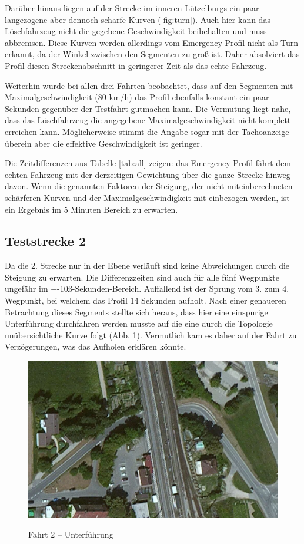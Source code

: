 Darüber hinaus liegen auf der Strecke im inneren Lützelburgs ein paar langezogene aber dennoch scharfe Kurven (\ref{fig:turn}). Auch hier kann das Löschfahrzeug nicht die gegebene Geschwindigkeit beibehalten und muss abbremsen. Diese Kurven werden allerdings vom Emergency Profil nicht als Turn erkannt, da der Winkel zwischen den Segmenten zu groß ist. Daher absolviert das Profil diesen Streckenabschnitt in geringerer Zeit als das echte Fahrzeug.

Weiterhin wurde bei allen drei Fahrten beobachtet, dass auf den Segmenten mit Maximalgeschwindigkeit (80 km/h) das Profil ebenfalls konstant ein paar Sekunden gegenüber der Testfahrt gutmachen kann.
Die Vermutung liegt nahe, dass das Löschfahrzeug die angegebene Maximalgeschwindigkeit nicht komplett erreichen kann. Möglicherweise stimmt die Angabe sogar mit der Tachoanzeige überein aber die effektive Geschwindigkeit ist geringer.

Die Zeitdifferenzen aus Tabelle \ref{tab:all} zeigen: das Emergency-Profil fährt dem echten Fahrzeug mit der derzeitigen Gewichtung über die ganze Strecke hinweg davon. Wenn die genannten Faktoren der Steigung, der nicht miteinberechneten schärferen Kurven und der Maximalgeschwindigkeit mit einbezogen werden, ist ein Ergebnis im 5 Minuten Bereich zu erwarten.


\subsection{Teststrecke 2}

Da die 2. Strecke nur in der Ebene verläuft sind keine Abweichungen durch die Steigung zu erwarten. Die Differenzzeiten sind auch für alle fünf Wegpunkte ungefähr im +-10ß-Sekunden-Bereich. Auffallend ist der Sprung vom 3. zum 4. Wegpunkt, bei welchem das Profil 14 Sekunden aufholt. Nach einer genaueren Betrachtung dieses Segments stellte sich heraus, dass hier eine einspurige Unterführung durchfahren werden musste auf die eine durch die Topologie unübersichtliche Kurve folgt (Abb. \ref{fig:traintunnel}). Vermutlich kam es daher auf der Fahrt zu Verzögerungen, was das Aufholen erklären könnte.

\begin{figure}[h]
\centering
\caption{Fahrt 2 -- Unterführung}
\label{fig:traintunnel}
\includegraphics[width = 0.70 \textwidth]{../media/traintunnel.png} \\
\end{figure}


